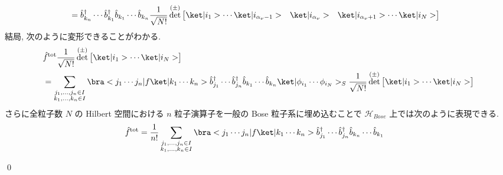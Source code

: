 \documentclass[uplatex,dvipdfmx,a4paper,11pt]{jlreq}
\makeatletter
\DeclareMathOperator{\Det}{det}
\newcommand{\HH}{\mathcal{H}}
\numberwithin{equation}{section}
\theoremstyle{definition}
\renewenvironment{proof}[1][\proofname]{\par
  \normalfont
  \topsep6\p@\@plus6\p@ \trivlist
  \item[\hskip\labelsep{\bfseries #1}\@addpunct{\bfseries}]\ignorespaces\quad\par
}{
  \qed\endtrivlist\@endpefalse
}
\renewcommand\proofname{証明}
\makeatother
\begin{document}
\begin{proof}
\begin{align}
     & = \hat{b}_{k_n}^\dagger\cdots\hat{b}_{k_1}^\dagger\hat{b}_{k_1}\cdots\hat{b}_{k_n}\frac{1}{\sqrt{N!}}\Det^{(\pm)}\begin{bmatrix}\ket|i_1>\cdots\ket|i_{\alpha_\nu-1}> & \ket|i_{\alpha_\nu}> & \ket|i_{\alpha_\nu+1}>\cdots\ket|i_N>\end{bmatrix}
  \end{align}
  結局, 次のように変形できることがわかる.
  \begin{align}
     & \hat{f}^{\mathrm{tot}}\frac{1}{\sqrt{N!}}\Det^{(\pm)}\begin{bmatrix}\ket|i_1>\cdots\ket|i_N>\end{bmatrix} \\
     & = \sum_{\substack{j_1,\ldots,j_n\in I                                                                     \\ k_1,\ldots,k_n\in I}}\bra<j_1\cdots j_n|f\ket|k_1\cdots k_n>\hat{b}_{j_1}^\dagger\cdots\hat{b}_{j_n}^\dagger\hat{b}_{k_1}\cdots\hat{b}_{k_n}\ket|\phi_{i_1}\cdots\phi_{i_N}>_S\frac{1}{\sqrt{N!}}\Det^{(\pm)}\begin{bmatrix}\ket|i_1>\cdots\ket|i_N>\end{bmatrix}
  \end{align}
  さらに全粒子数 $N$ の Hilbert 空間における $n$ 粒子演算子を一般の Bose 粒子系に埋め込むことで $\HH_{Bose}$ 上では次のように表現できる.
  \begin{align}
    \hat{f}^{\mathrm{tot}} & = \frac{1}{n!}\sum_{\substack{j_1,\ldots,j_n\in I \\ k_1,\ldots,k_n\in I}}\bra<j_1\cdots j_n|f\ket|k_1\cdots k_n>\hat{b}_{j_1}^\dagger\cdots\hat{b}_{j_n}^\dagger\hat{b}_{k_n}\cdots\hat{b}_{k_1}
  \end{align}
\end{proof}
\end{document}

